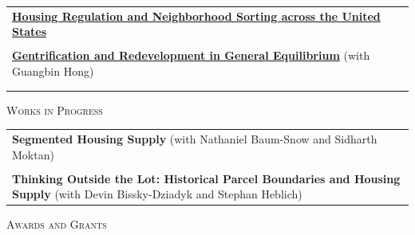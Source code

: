 \documentclass[11pt]{amsart}
\begin{document}
\begin{tabular}{ p{15.5cm}}
 \href{https://jamesmacek.github.io/research/lswus}{\textbf{Housing Regulation and Neighborhood Sorting across the United States}}                         \\

\\
 \href{https://jamesmacek.github.io/research/gent}{\textbf{Gentrification and Redevelopment in General Equilibrium}} (with Guangbin Hong) \\
\\
\normalsize
\end{tabular}

\vspace{0.2cm}

\LARGE
\textsc{Works in Progress}
\vspace{0.2cm}
\normalsize

\begin{tabular}{ p{15.5cm}}
	\textbf{Segmented Housing Supply} (with Nathaniel Baum-Snow and Sidharth Moktan)                        \\
	
	\\
	
	\textbf{Thinking Outside the Lot: Historical Parcel Boundaries and Housing Supply} (with Devin Bissky-Dziadyk and Stephan Heblich) 

	\normalsize
\end{tabular}



\vspace{0.2cm}

\LARGE
\textsc{Awards and Grants}
\vspace{0.2cm}
\end{document}
